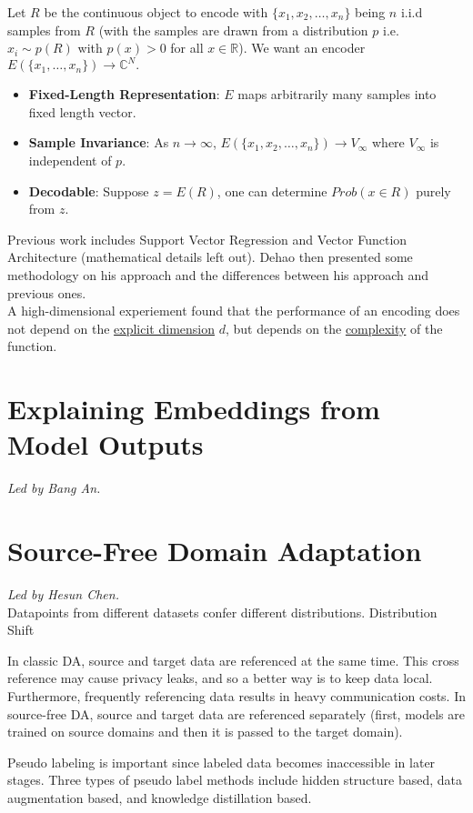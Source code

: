 \documentclass[12pt]{amsart}
\begin{document}
Let $R$ be the continuous object to encode with $\{x_1, x_2, \dots, x_n\}$ being $n$ i.i.d samples from $R$ (with the samples are drawn from a distribution $p$ i.e. $x_i \sim p(R)$ with $p(x) > 0$ for all $x \in \mathbb{R}$). We want an encoder $E(\{x_1, \dots, x_n\}) \rightarrow \mathbb{C}^N.$

\begin{itemize}
    \item \textbf{Fixed-Length Representation}: $E$ maps arbitrarily many samples into fixed length vector.
    \item \textbf{Sample Invariance}: As $n \rightarrow \infty$, $E(\{x_1, x_2, \dots, x_n\}) \rightarrow V_\infty$ where $V_\infty$ is independent of $p$.
    \item \textbf{Decodable}: Suppose $z=E(R)$, one can determine $Prob(x \in R)$ purely from $z$.
\end{itemize}

Previous work includes Support Vector Regression and Vector Function Architecture (mathematical details left out). Dehao then presented some methodology on his approach and the differences between his approach and previous ones. \\

A high-dimensional experiement found that the performance of an encoding does not depend on the \underline{explicit dimension} $d$, but depends on the \underline{complexity} of the function.

\section{Explaining Embeddings from Model Outputs}

\textit{Led by Bang An.} \\

\newpage

\section{Source-Free Domain Adaptation}

\textit{Led by Hesun Chen.} \\

Datapoints from different datasets confer different distributions. Distribution Shift

In classic DA, source and target data are referenced at the same time. This cross reference may cause privacy leaks, and so a better way is to keep data local. Furthermore, frequently referencing data results in heavy communication costs. In source-free DA, source and target data are referenced separately (first, models are trained on source domains and then it is passed to the target domain).

Pseudo labeling is important since labeled data becomes inaccessible in later stages. Three types of pseudo label methods include hidden structure based, data augmentation based, and knowledge distillation based.
\end{document}
